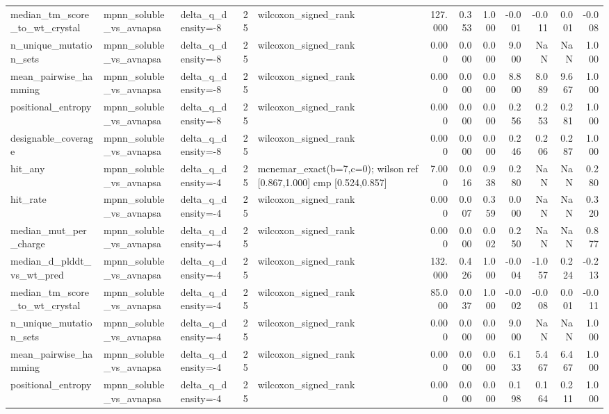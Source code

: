 \begin{table}
{\begin{tabular}{lllrlrrrrrrr}
median\_tm\_score\_to\_wt\_crystal & mpnn\_soluble\_vs\_avnapsa & delta\_q\_density=-8 & 25 & wilcoxon\_signed\_rank & 127.000 & 0.353 & 1.000 & -0.001 & -0.011 & 0.001 & -0.008 \\
n\_unique\_mutation\_sets & mpnn\_soluble\_vs\_avnapsa & delta\_q\_density=-8 & 25 & wilcoxon\_signed\_rank & 0.000 & 0.000 & 0.000 & 9.000 & NaN & NaN & 1.000 \\
mean\_pairwise\_hamming & mpnn\_soluble\_vs\_avnapsa & delta\_q\_density=-8 & 25 & wilcoxon\_signed\_rank & 0.000 & 0.000 & 0.000 & 8.800 & 8.089 & 9.667 & 1.000 \\
positional\_entropy & mpnn\_soluble\_vs\_avnapsa & delta\_q\_density=-8 & 25 & wilcoxon\_signed\_rank & 0.000 & 0.000 & 0.000 & 0.256 & 0.253 & 0.281 & 1.000 \\
designable\_coverage & mpnn\_soluble\_vs\_avnapsa & delta\_q\_density=-8 & 25 & wilcoxon\_signed\_rank & 0.000 & 0.000 & 0.000 & 0.246 & 0.206 & 0.287 & 1.000 \\
hit\_any & mpnn\_soluble\_vs\_avnapsa & delta\_q\_density=-4 & 25 & mcnemar\_exact(b=7,c=0); wilson ref [0.867,1.000] cmp [0.524,0.857] & 7.000 & 0.016 & 0.938 & 0.280 & NaN & NaN & 0.280 \\
hit\_rate & mpnn\_soluble\_vs\_avnapsa & delta\_q\_density=-4 & 25 & wilcoxon\_signed\_rank & 0.000 & 0.007 & 0.359 & 0.000 & NaN & NaN & 0.320 \\
median\_mut\_per\_charge & mpnn\_soluble\_vs\_avnapsa & delta\_q\_density=-4 & 25 & wilcoxon\_signed\_rank & 0.000 & 0.000 & 0.002 & 0.250 & NaN & NaN & 0.877 \\
median\_d\_plddt\_vs\_wt\_pred & mpnn\_soluble\_vs\_avnapsa & delta\_q\_density=-4 & 25 & wilcoxon\_signed\_rank & 132.000 & 0.426 & 1.000 & -0.004 & -1.057 & 0.224 & -0.213 \\
median\_tm\_score\_to\_wt\_crystal & mpnn\_soluble\_vs\_avnapsa & delta\_q\_density=-4 & 25 & wilcoxon\_signed\_rank & 85.000 & 0.037 & 1.000 & -0.002 & -0.008 & 0.001 & -0.011 \\
n\_unique\_mutation\_sets & mpnn\_soluble\_vs\_avnapsa & delta\_q\_density=-4 & 25 & wilcoxon\_signed\_rank & 0.000 & 0.000 & 0.000 & 9.000 & NaN & NaN & 1.000 \\
mean\_pairwise\_hamming & mpnn\_soluble\_vs\_avnapsa & delta\_q\_density=-4 & 25 & wilcoxon\_signed\_rank & 0.000 & 0.000 & 0.000 & 6.133 & 5.467 & 6.467 & 1.000 \\
positional\_entropy & mpnn\_soluble\_vs\_avnapsa & delta\_q\_density=-4 & 25 & wilcoxon\_signed\_rank & 0.000 & 0.000 & 0.000 & 0.198 & 0.164 & 0.211 & 1.000 \\

\end{tabular}}
\end{table}
